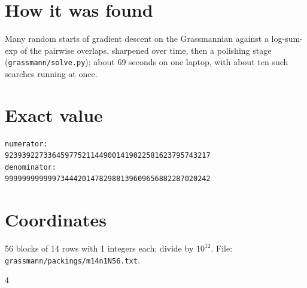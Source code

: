 \documentclass[11pt,a4paper]{article}
\begin{document}
\section{How it was found}
Many random starts of gradient descent on the Grassmannian against a log-sum-exp of the pairwise overlaps, sharpened over time, then a polishing stage (\texttt{grassmann/solve.py}); about 69 seconds on one laptop, with about ten such searches running at once.


\appendix
\section{Exact value}
{\small
\begin{verbatim}
numerator:
923939227336459775211449001419022581623795743217
denominator:
999999999999734442014782988139609656882287020242
\end{verbatim}}

\section{Coordinates}
56 blocks of 14 rows with 1 integers each; divide by $10^{12}$. File: \texttt{grassmann/packings/m14n1N56.txt}.
{\tiny
\begin{multicols}{4}
\end{multicols}}
\end{document}
